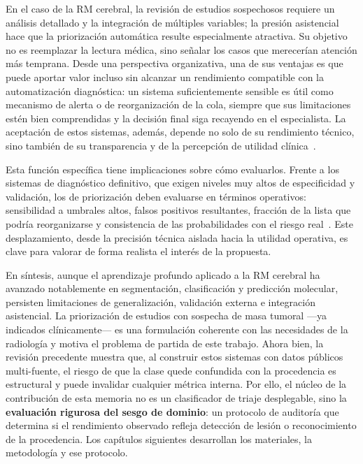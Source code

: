 En el caso de la RM cerebral, la revisión de estudios sospechosos requiere un
análisis detallado y la integración de múltiples variables; la presión asistencial
hace que la priorización automática resulte especialmente atractiva. Su objetivo
no es reemplazar la lectura médica, sino señalar los casos que merecerían atención
más temprana. Desde una perspectiva organizativa, una de sus ventajas es que
puede aportar valor incluso sin alcanzar un rendimiento compatible con la
automatización diagnóstica: un sistema suficientemente sensible es útil como
mecanismo de alerta o de reorganización de la cola, siempre que sus limitaciones
estén bien comprendidas y la decisión final siga recayendo en el especialista. La
aceptación de estos sistemas, además, depende no solo de su rendimiento técnico,
sino también de su transparencia y de la percepción de utilidad clínica~\cite{lambert2023acceptance,lee2022implementation}.

Esta función específica tiene implicaciones sobre cómo evaluarlos. Frente a los
sistemas de diagnóstico definitivo, que exigen niveles muy altos de especificidad
y validación, los de priorización deben evaluarse en términos operativos:
sensibilidad a umbrales altos, falsos positivos resultantes, fracción de la lista
que podría reorganizarse y consistencia de las probabilidades con el riesgo
real~\cite{sharma2020diagnostic}. Este desplazamiento, desde la precisión técnica
aislada hacia la utilidad operativa, es clave para valorar de forma realista el
interés de la propuesta.

En síntesis, aunque el aprendizaje profundo aplicado a la RM cerebral ha avanzado
notablemente en segmentación, clasificación y predicción molecular, persisten
limitaciones de generalización, validación externa e integración asistencial. La
priorización de estudios con sospecha de masa tumoral ---ya indicados
clínicamente--- es una formulación coherente con las necesidades de la radiología
y motiva el problema de partida de este trabajo. Ahora bien, la revisión
precedente muestra que, al construir estos sistemas con datos públicos
multi-fuente, el riesgo de que la clase quede confundida con la procedencia es
estructural y puede invalidar cualquier métrica interna. Por ello, el núcleo de
la contribución de esta memoria no es un clasificador de triaje desplegable, sino
la \textbf{evaluación rigurosa del sesgo de dominio}: un protocolo de auditoría
que determina si el rendimiento observado refleja detección de lesión o
reconocimiento de la procedencia. Los capítulos siguientes desarrollan los
materiales, la metodología y ese protocolo.
